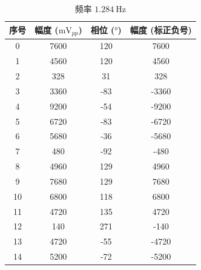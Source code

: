 \documentclass{customDoc}
\begin{document}
\parbox{0.6\textwidth}{
\begin{longtable}{|c|c|c|c|}
  \caption{频率 $\SI{1.284}{\hertz}$} \\
    \hline
    序号    & 幅度 ($\si{\milli\volt}_{pp}$) & 相位 ($\si{\degree}$) & 幅度 (标正负号) \\
    \hline
    0     & 7600  & 120   & 7600 \\
    \hline
    1     & 4560  & 120   & 4560 \\
    \hline
    2     & 328   & 31    & 328 \\
    \hline
    3     & 3360  & -83   & -3360 \\
    \hline
    4     & 9200  & -54   & -9200 \\
    \hline
    5     & 6720  & -83   & -6720 \\
    \hline
    6     & 5680  & -36   & -5680 \\
    \hline
    7     & 480   & -92   & -480 \\
    \hline
    8     & 4960  & 129   & 4960 \\
    \hline
    9     & 7680  & 129   & 7680 \\
    \hline
    10    & 6800  & 118   & 6800 \\
    \hline
    11    & 4720  & 135   & 4720 \\
    \hline
    12    & 140   & 271   & -140 \\
    \hline
    13    & 4720  & -55   & -4720 \\
    \hline
    14    & 5200  & -72   & -5200 \\
    \hline
\end{longtable}
}

\vspace{-25pt}
\end{document}
